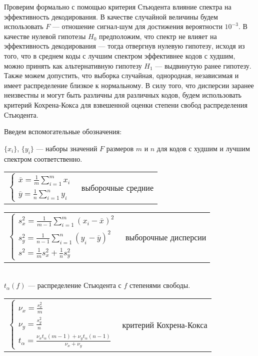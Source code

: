 Проверим формально с помощью критерия Стьюдента влияние спектра на эффективность декодирования.
В качестве случайной величины будем использовать $F$ --- отношение сигнал-шум для достижения вероятности
$10^{-3}$. В качестве нулевой гипотезы $H_0$ предположим, что спектр не влияет на эффективность декодирования
--- тогда отвергнув нулевую гипотезу, исходя из того, что в среднем коды с лучшим спектром эффективнее
кодов с худшим, можно принять как альтернативную гипотезу $H_1$ --- выдвинутую ранее гипотезу. Также
можем допустить, что выборка случайная, однородная, независимая и имеет распределение близкое к нормальному.
В силу того, что дисперсии заранее неизвестны и могут быть различны для различных кодов, будем
использовать критерий Кохрена-Кокса для взвешенной оценки степени свобод распределения Стьюдента.
\pagebreak

Введем вспомогательные обозначения:

$\{x_i\}$, $\{y_i\}$ --- наборы значений $F$ размеров $m$ и $n$ для кодов с худшим и лучшим спектром соответственно.
\\

\begin{tabular}{l c}
$
\begin{cases}
	\overline{x}=\frac{1}{m}\sum_{i=1}^{m}x_i \\
	\overline{y}=\frac{1}{n}\sum_{i=1}^{n}y_i
\end{cases}
$ & выборочные средние
\end{tabular}

\begin{tabular}{l c}
$\begin{cases}
s_x^2=\frac{1}{m-1}\sum_{i=1}^{m}(x_i-\overline{x})^2 \\
s_y^2=\frac{1}{n-1}\sum_{i=1}^{n}(y_i-\overline{y})^2 \\
 s^2=\frac{1}{m}s_x^2+\frac{1}{n}s_y^2
\end{cases}
$ & выборочные дисперсии
\end{tabular}
\\

$t_{\alpha}(f)$ --- распределение Стьюдента с $f$
степенями свободы.
\\

\begin{tabular}{l c}
$\begin{cases}
\nu_x=\frac{s_x^2}{m} \\
\nu_y=\frac{s_y^2}{n} \\
 t_{\alpha}=\frac{\nu_x t_{\alpha}(m-1)+\nu_y t_{\alpha}(n-1)}{\nu_x+\nu_y}
\end{cases}
$ & критерий Кохрена-Кокса
\end{tabular}
\\

